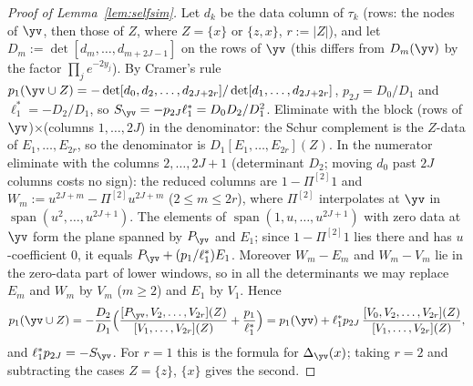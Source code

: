 \begin{proof}[Proof of Lemma~\textup{\ref{lem:selfsim}}]
Let $d_k$ be the data column of $\tau_k$ (rows: the nodes of $\yv$, then those of $Z$, where $Z=\{x\}$ or
$\{z,x\}$, $r:=|Z|$), and let $D_m:=\det[d_m,\dots,d_{m+2J-1}]$ on the rows of $\yv$ (this differs from $D_m(\yv)$ by
the factor $\prod_je^{-2y_j}$). By Cramer's rule
$p_1(\yv\cup Z)=-\det[d_0,d_2,\dots,d_{2J+2r}]/\det[d_1,\dots,d_{2J+2r}]$, $p_{2J}=D_0/D_1$ and $\ell_1^*=-D_2/D_1$, so
$S_{\yv}=-p_{2J}\ell_1^*=D_0D_2/D_1^2$. Eliminate with the block (rows of $\yv$)$\times$(columns
$1,\dots,2J$) in the denominator: the Schur complement is the $Z$-data of $E_1,\dots,E_{2r}$, so the denominator is
$D_1[E_1,\dots,E_{2r}](Z)$. In the numerator eliminate with the columns $2,\dots,2J+1$ (determinant $D_2$; moving $d_0$
past $2J$ columns costs no sign): the reduced columns are $1-\Pi^{[2]}1$ and $W_m:=u^{2J+m}-\Pi^{[2]}u^{2J+m}$
($2\le m\le2r$), where $\Pi^{[2]}$ interpolates at $\yv$ in $\operatorname{span}(u^2,\dots,u^{2J+1})$. The elements of
$\operatorname{span}(1,u,\dots,u^{2J+1})$ with zero data at $\yv$ form the plane spanned by $P_{\yv}$ and $E_1$; since
$1-\Pi^{[2]}1$ lies there and has $u$-coefficient $0$, it equals $P_{\yv}+(p_1/\ell_1^*)E_1$. Moreover $W_m-E_m$ and
$W_m-V_m$ lie in the zero-data part of lower windows, so in all the determinants we may replace $E_m$ and $W_m$ by
$V_m$ ($m\ge2$) and $E_1$ by $V_1$. Hence
\[
  p_1(\yv\cup Z)=-\frac{D_2}{D_1}\Bigl(\frac{[P_{\yv},V_2,\dots,V_{2r}](Z)}{[V_1,\dots,V_{2r}](Z)}+\frac{p_1}{\ell_1^*}\Bigr)
  =p_1(\yv)+\ell_1^*p_{2J}\,\frac{[V_0,V_2,\dots,V_{2r}](Z)}{[V_1,\dots,V_{2r}](Z)},
\]
and $\ell_1^*p_{2J}=-S_{\yv}$. For $r=1$ this is the formula for $\Delta_{\yv}(x)$; taking $r=2$ and subtracting the
cases $Z=\{z\}$, $\{x\}$ gives the second.
\end{proof}

